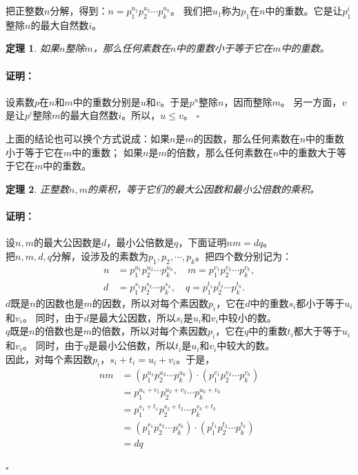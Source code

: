 \documentclass[12pt,UTF8]{ctexbook}
\newtheorem{tm}{定理}[section]
\newenvironment{proof2}{\paragraph{\textbf{证明：}}}{\hfill$\square$}
\begin{document}
把正整数$n$分解，得到：$n = p_1^{u_1} p_2^{u_2} \cdots p_k^{u_k}$。
我们把$u_1$称为$p_1$在$n$中的重数。它是让$p_1^i$整除$n$的最大自然数$i$。
\begin{tm}\label{tm:1-1-10}
    如果$n$整除$m$，那么任何素数在$n$中的重数小于等于它在$m$中的重数。
\end{tm}
\begin{proof2}
    设素数$p$在$n$和$m$中的重数分别是$u$和$v$。于是$p^u$整除$n$，因而整除$m$。
    另一方面，$v$是让$p^i$整除$m$的最大自然数$i$。所以，$u \leqslant v$。
\end{proof2}

上面的结论也可以换个方式说成：如果$n$是$m$的因数，那么任何素数在$n$中的重数小于等于它在$m$中的重数；
如果$n$是$m$的倍数，那么任何素数在$n$中的重数大于等于它在$m$中的重数。

\begin{tm}\label{tm:1-1-20}
    正整数$n,m$的乘积，等于它们的最大公因数和最小公倍数的乘积。
\end{tm}
\begin{proof2}
    设$n,m$的最大公因数是$d$，最小公倍数是$q$，下面证明$nm = dq$。\\
    把$n,m,d,q$分解，设涉及的素数为$p_1, p_2, \cdots , p_k$。把四个数分别记为：
    \begin{align*}
        n &= p_1^{u_1}p_2^{u_2}\cdots p_k^{u_k}, \quad m = p_1^{v_1}p_2^{v_2}\cdots p_k^{v_k},  \\
        d &= p_1^{s_1}p_2^{s_2}\cdots p_k^{s_k}, \quad q = p_1^{t_1}p_2^{t_2}\cdots p_k^{t_k}.  
    \end{align*}
    $d$既是$n$的因数也是$m$的因数，所以对每个素因数$p_i$，它在$d$中的重数$s_i$都小于等于$u_i$和$v_i$。
    同时，由于$d$是最大公因数，所以$s_i$是$u_i$和$v_i$中较小的数。\\
    $q$既是$n$的倍数也是$m$的倍数，所以对每个素因数$p_i$，它在$q$中的重数$t_i$都大于等于$u_i$和$v_i$。
    同时，由于$q$是最小公倍数，所以$t_i$是$u_i$和$v_i$中较大的数。\\
    因此，对每个素因数$p_i$，$s_i + t_i = u_i + v_i$。于是，
    \begin{align*}
        nm &= \left(p_1^{u_1}p_2^{u_2}\cdots p_k^{u_k}\right) \cdot \left(p_1^{v_1}p_2^{v_2}\cdots p_k^{v_k}\right)  \\
        &= p_1^{u_1 + v_1}p_2^{u_2 + v_2}\cdots p_k^{u_k + v_k}  \\
        &= p_1^{s_1 + t_1}p_2^{s_2 + t_2}\cdots p_k^{s_k + t_k}  \\
        &= \left(p_1^{s_1}p_2^{s_2}\cdots p_k^{s_k}\right) \cdot \left(p_1^{t_1}p_2^{t_2}\cdots p_k^{t_k}\right)  \\
        &= dq 
    \end{align*}    

\end{proof2}
\end{document}
